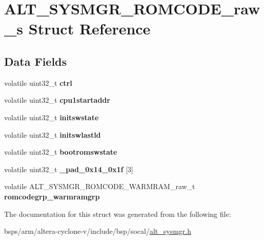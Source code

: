 \hypertarget{structALT__SYSMGR__ROMCODE__raw__s}{}\section{A\+L\+T\+\_\+\+S\+Y\+S\+M\+G\+R\+\_\+\+R\+O\+M\+C\+O\+D\+E\+\_\+raw\+\_\+s Struct Reference}
\label{structALT__SYSMGR__ROMCODE__raw__s}
\subsection*{Data Fields}
\begin{DoxyCompactItemize}
\item 
\mbox{\label{structALT__SYSMGR__ROMCODE__raw__s_aa288cc43225ec85daeecdcd66a7a7da4}} 
volatile uint32\+\_\+t {\bfseries ctrl}
\item 
\mbox{\label{structALT__SYSMGR__ROMCODE__raw__s_a9ed3fa5440ea84e0600e0fc74e950698}} 
volatile uint32\+\_\+t {\bfseries cpu1startaddr}
\item 
\mbox{\label{structALT__SYSMGR__ROMCODE__raw__s_adccf819bcf33399e95a94ad6e894c56b}} 
volatile uint32\+\_\+t {\bfseries initswstate}
\item 
\mbox{\label{structALT__SYSMGR__ROMCODE__raw__s_ab89db3eb5aa20f2287a168c169632305}} 
volatile uint32\+\_\+t {\bfseries initswlastld}
\item 
\mbox{\label{structALT__SYSMGR__ROMCODE__raw__s_ae74e96c1015e689c0e7b288faab1b8fa}} 
volatile uint32\+\_\+t {\bfseries bootromswstate}
\item 
\mbox{\label{structALT__SYSMGR__ROMCODE__raw__s_abbc2e687fd25bc323e0707402bf9defb}} 
volatile uint32\+\_\+t {\bfseries \+\_\+pad\+\_\+0x14\+\_\+0x1f} \mbox{[}3\mbox{]}
\item 
\mbox{\label{structALT__SYSMGR__ROMCODE__raw__s_a91cec381200b84d0ac87958a8342aed2}} 
volatile A\+L\+T\+\_\+\+S\+Y\+S\+M\+G\+R\+\_\+\+R\+O\+M\+C\+O\+D\+E\+\_\+\+W\+A\+R\+M\+R\+A\+M\+\_\+raw\+\_\+t {\bfseries romcodegrp\+\_\+warmramgrp}
\end{DoxyCompactItemize}


The documentation for this struct was generated from the following file\+:\begin{DoxyCompactItemize}
\item 
bsps/arm/altera-\/cyclone-\/v/include/bsp/socal/\mbox{\hyperlink{alt__sysmgr_8h}{alt\+\_\+sysmgr.\+h}}\end{DoxyCompactItemize}
